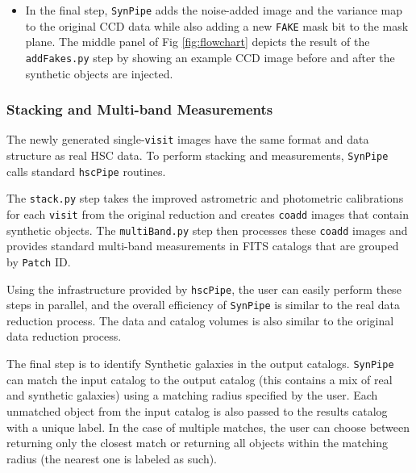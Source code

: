 \documentclass[useamsfonts]{pasj01}
\def\hscpipe{\texttt{hscPipe}}
\def\synpipe{\texttt{SynPipe}}
\def\coadd{\texttt{coadd}}
\def\visit{\texttt{visit}}
\begin{document}
\begin{itemize}
        \item In the final step, \synpipe{} adds the noise-added image and the 
            variance map to the original CCD data while also adding a new 
            \texttt{FAKE} mask bit to the mask plane.
            The middle panel of Fig \ref{fig:flowchart} depicts the result of the
            \texttt{addFakes.py} step by showing an example CCD image before and 
            after the synthetic objects are injected.
    
    \end{itemize}

\subsubsection{Stacking and Multi-band Measurements}
    \label{sssec:multiband}

    The newly generated single-\visit{} images have the same format and data
    structure as real HSC data. To perform stacking and measurements, \synpipe{} calls 
    standard \hscpipe{} routines.
    
    The \texttt{stack.py} step takes the improved astrometric and photometric
    calibrations for each \visit{} from the original reduction and creates
    \coadd{} images that contain synthetic objects.
    The \texttt{multiBand.py} step then processes these \coadd{}  images and
    provides standard multi-band measurements in FITS catalogs that are grouped by
    \texttt{Patch} ID.

    Using the infrastructure provided by \hscpipe{}, the user can easily perform these 
    steps in parallel, and the overall efficiency of \synpipe{} is similar to
    the real data reduction process. 
    The data and catalog volumes is also similar to the original data reduction process.

    The final step is to identify Synthetic galaxies in the output catalogs. 
    \synpipe{} can match the input catalog to the output catalog (this contains a mix 
    of real and synthetic galaxies) using a matching radius specified by the user.
    Each unmatched object from the input catalog is also passed to the results catalog
    with a unique label.
    In the case of multiple matches, the user can choose between returning only the
    closest match or returning all objects within the matching radius (the nearest one
    is labeled as such).
\end{document}
